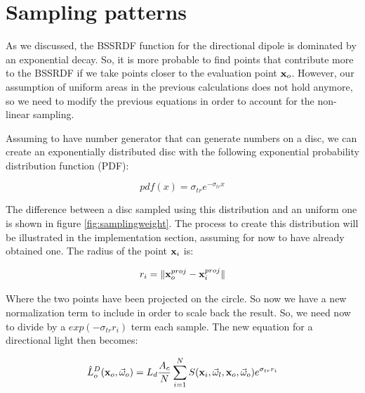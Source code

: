 \section{Sampling patterns}
\label{sec:patterns}
As we discussed, the BSSRDF function for the directional dipole is dominated by an exponential decay. So, it is more probable to find points that contribute more to the BSSRDF if we take points closer to the evaluation point $\mathbf{x}_o$. However, our assumption of uniform areas in the previous calculations does not hold anymore, so we need to modify the previous equations in order to account for the non-linear sampling.

Assuming to have number generator that can generate numbers on a disc, we can create an exponentially distributed disc with the following exponential probability distribution function (PDF):

$$
pdf(x) = \sigma_{tr} e^{-\sigma_{tr} x}
$$

The difference between a disc sampled using this distribution and an uniform one is shown in figure \ref{fig:samplingweight}. The process to create this distribution will be illustrated in the implementation section, assuming for now to have already obtained one. The radius of the point $\mathbf{x}_i$ is: 

$$
r_i = \|\mathbf{x}_o^{proj} - \mathbf{x}_i^{proj}\|
$$

Where the two points have been projected on the circle. So now we have a new normalization term to include in order to scale back the result. So, we need now to divide by a $exp(-\sigma_{tr} r_i)$ term each sample. The new equation for a directional light then becomes:

$$
\hat{L}_o^D(\mathbf{x}_o,\vec{\omega}_o) = L_d \frac{A_c}{N} \sum_{i = 1}^N S(\mathbf{x}_i, \vec{\omega}_l, \mathbf{x}_o, \vec{\omega}_o) e^{\sigma_{tr} r_i}
$$

